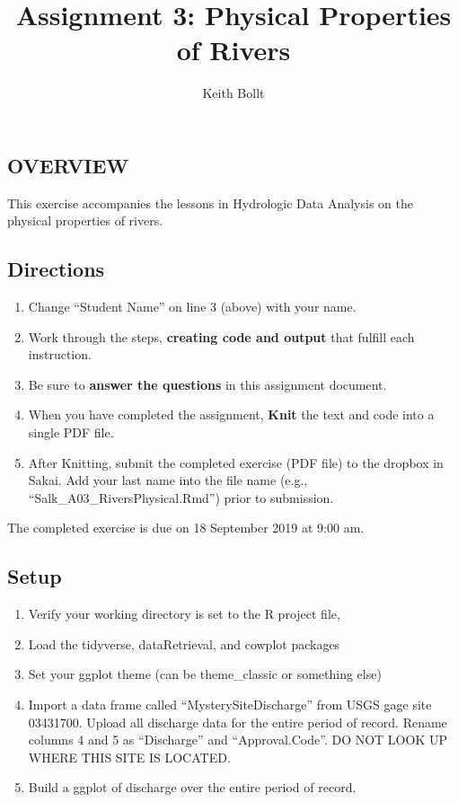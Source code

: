 \documentclass[]{article}
\title{Assignment 3: Physical Properties of Rivers}
\author{Keith Bollt}
\date{}
\providecommand{\tightlist}{%
  \setlength{\itemsep}{0pt}\setlength{\parskip}{0pt}}
\begin{document}
\maketitle

\hypertarget{overview}{%
\subsection{OVERVIEW}\label{overview}}

This exercise accompanies the lessons in Hydrologic Data Analysis on the
physical properties of rivers.

\hypertarget{directions}{%
\subsection{Directions}\label{directions}}

\begin{enumerate}
\def\labelenumi{\arabic{enumi}.}
\tightlist
\item
  Change ``Student Name'' on line 3 (above) with your name.
\item
  Work through the steps, \textbf{creating code and output} that fulfill
  each instruction.
\item
  Be sure to \textbf{answer the questions} in this assignment document.
\item
  When you have completed the assignment, \textbf{Knit} the text and
  code into a single PDF file.
\item
  After Knitting, submit the completed exercise (PDF file) to the
  dropbox in Sakai. Add your last name into the file name (e.g.,
  ``Salk\_A03\_RiversPhysical.Rmd'') prior to submission.
\end{enumerate}

The completed exercise is due on 18 September 2019 at 9:00 am.

\hypertarget{setup}{%
\subsection{Setup}\label{setup}}

\begin{enumerate}
\def\labelenumi{\arabic{enumi}.}
\tightlist
\item
  Verify your working directory is set to the R project file,
\item
  Load the tidyverse, dataRetrieval, and cowplot packages
\item
  Set your ggplot theme (can be theme\_classic or something else)
\item
  Import a data frame called ``MysterySiteDischarge'' from USGS gage
  site 03431700. Upload all discharge data for the entire period of
  record. Rename columns 4 and 5 as ``Discharge'' and ``Approval.Code''.
  DO NOT LOOK UP WHERE THIS SITE IS LOCATED.
\item
  Build a ggplot of discharge over the entire period of record.
\end{enumerate}
\end{document}
